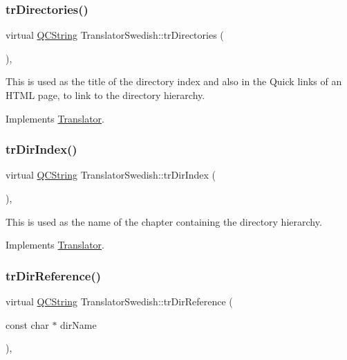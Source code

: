 \subsubsection{\texorpdfstring{trDirectories()}{trDirectories()}}
{\footnotesize\ttfamily virtual \mbox{\hyperlink{class_q_c_string}{Q\+C\+String}} Translator\+Swedish\+::tr\+Directories (\begin{DoxyParamCaption}{ }\end{DoxyParamCaption})\hspace{0.3cm}{\ttfamily [inline]}, {\ttfamily [virtual]}}

This is used as the title of the directory index and also in the Quick links of an H\+T\+ML page, to link to the directory hierarchy. 

Implements \mbox{\hyperlink{class_translator}{Translator}}.

\mbox{\label{class_translator_swedish_a9c7c0d6b5a5a40acb77d62b7d79d73ed}} 
\subsubsection{\texorpdfstring{trDirIndex()}{trDirIndex()}}
{\footnotesize\ttfamily virtual \mbox{\hyperlink{class_q_c_string}{Q\+C\+String}} Translator\+Swedish\+::tr\+Dir\+Index (\begin{DoxyParamCaption}{ }\end{DoxyParamCaption})\hspace{0.3cm}{\ttfamily [inline]}, {\ttfamily [virtual]}}

This is used as the name of the chapter containing the directory hierarchy. 

Implements \mbox{\hyperlink{class_translator}{Translator}}.

\mbox{\label{class_translator_swedish_a8a6af1515c66a4da8cef6075cdad8abd}} 
\subsubsection{\texorpdfstring{trDirReference()}{trDirReference()}}
{\footnotesize\ttfamily virtual \mbox{\hyperlink{class_q_c_string}{Q\+C\+String}} Translator\+Swedish\+::tr\+Dir\+Reference (\begin{DoxyParamCaption}\item[{const char $\ast$}]{dir\+Name }\end{DoxyParamCaption})\hspace{0.3cm}{\ttfamily [inline]}, {\ttfamily [virtual]}}

